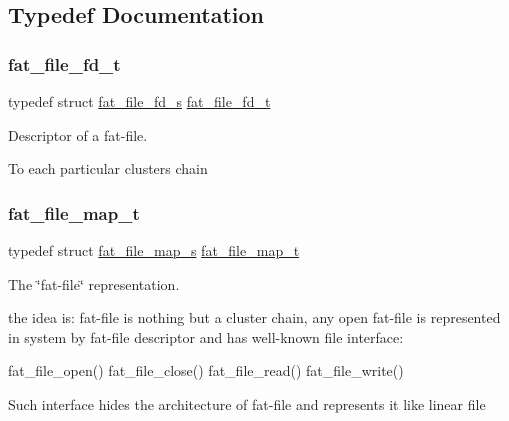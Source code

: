 \subsection{Typedef Documentation}
\mbox{\label{group__libfs__ff_gaa53f9c544914509505e3cfbd3796f877}} 
\subsubsection{\texorpdfstring{fat\_file\_fd\_t}{fat\_file\_fd\_t}}
{\footnotesize\ttfamily typedef struct \mbox{\hyperlink{structfat__file__fd__s}{fat\+\_\+file\+\_\+fd\+\_\+s}}  \mbox{\hyperlink{group__libfs__ff_gaa53f9c544914509505e3cfbd3796f877}{fat\+\_\+file\+\_\+fd\+\_\+t}}}



Descriptor of a fat-\/file. 

To each particular clusters chain \mbox{\label{group__libfs__ff_gab16eea01f8ddea275cd616cc28082ff8}} 
\subsubsection{\texorpdfstring{fat\_file\_map\_t}{fat\_file\_map\_t}}
{\footnotesize\ttfamily typedef struct \mbox{\hyperlink{structfat__file__map__s}{fat\+\_\+file\+\_\+map\+\_\+s}}  \mbox{\hyperlink{group__libfs__ff_gab16eea01f8ddea275cd616cc28082ff8}{fat\+\_\+file\+\_\+map\+\_\+t}}}



The \char`\"{}fat-\/file\char`\"{} representation. 

the idea is\+: fat-\/file is nothing but a cluster chain, any open fat-\/file is represented in system by fat-\/file descriptor and has well-\/known file interface\+:

fat\+\_\+file\+\_\+open() fat\+\_\+file\+\_\+close() fat\+\_\+file\+\_\+read() fat\+\_\+file\+\_\+write()

Such interface hides the architecture of fat-\/file and represents it like linear file 